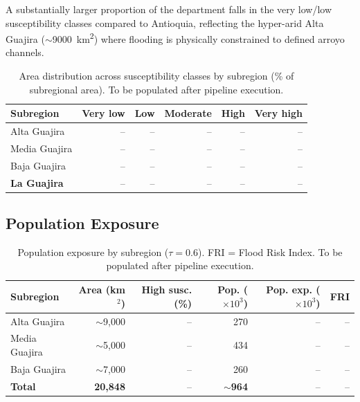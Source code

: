 \documentclass{article}
\begin{document}
A substantially larger proportion of the department falls in the very low/low susceptibility classes compared to Antioquia, reflecting the hyper-arid Alta Guajira ($\sim$\SI{9000}{\kilo\metre\squared}) where flooding is physically constrained to defined arroyo channels.

\begin{table}[htbp]
\caption{Area distribution across susceptibility classes by subregion (\% of subregional area). To be populated after pipeline execution.}
\label{tab:suscept_area}
\centering
\footnotesize
\begin{tabular}{lrrrrr}
\toprule
\textbf{Subregion} & \textbf{Very low} & \textbf{Low} & \textbf{Moderate} & \textbf{High} & \textbf{Very high} \\
\midrule
Alta Guajira       & -- & -- & -- & -- & -- \\
Media Guajira      & -- & -- & -- & -- & -- \\
Baja Guajira       & -- & -- & -- & -- & -- \\
\midrule
\textbf{La Guajira} & -- & -- & -- & -- & -- \\
\bottomrule
\end{tabular}
\end{table}

\subsection{Population Exposure}

\begin{table}[htbp]
\caption{Population exposure by subregion ($\tau = 0.6$). FRI = Flood Risk Index. To be populated after pipeline execution.}
\label{tab:exposure}
\centering
\footnotesize
\begin{tabular}{lrrrrr}
\toprule
\textbf{Subregion} & \textbf{Area (km$^2$)} & \textbf{High susc. (\%)} & \textbf{Pop. ($\times 10^3$)} & \textbf{Pop. exp. ($\times 10^3$)} & \textbf{FRI} \\
\midrule
Alta Guajira       & $\sim$9,000  & -- & 270  & -- & -- \\
Media Guajira      & $\sim$5,000  & -- & 434  & -- & -- \\
Baja Guajira       & $\sim$7,000  & -- & 260  & -- & -- \\
\midrule
\textbf{Total}     & \textbf{20,848} & -- & \textbf{$\sim$964} & -- & -- \\
\bottomrule
\end{tabular}
\end{table}
\end{document}
